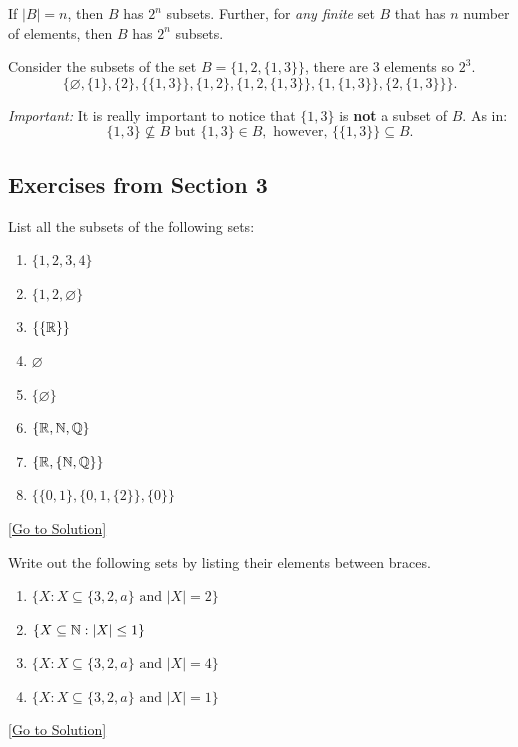 \begin{fact}
    If $\lvert B \rvert=n$, then $B$ has $2^n$ subsets. Further, for \emph{any finite} set $B$ that has $n$ number of elements, then $B$ has $2^n$ subsets.    
\end{fact}

\begin{example}
    Consider the subsets of the set $B=\{ 1,2,\{ 1,3 \} \}$, there are $3$ elements so $2^3$. 
    $$
    \{\varnothing,\{ 1 \},\{ 2 \}, \{ \{ 1,3 \} \}, \{ 1,2 \},\{ 1,2,\{ 1,3 \} \}, \{ 1,\{ 1,3 \} \},\{ 2,\{ 1,3 \} \}\}.
    $$
    
    \emph{Important:} It is really important to notice that $\{ 1,3 \}$ is \textbf{not} a subset of $B$. As in: 
    $$
    \{ 1,3 \}\not\subseteq B \text{ but }\{ 1,3 \}\in B, \text{ however, } \{ \{ 1,3 \} \}\subseteq B.
    $$
\end{example}

\subsection{Exercises from Section 3}
\begin{exercise}\label{ex:3.1}
    List all the subsets of the following sets:
    \begin{enumerate}
        \item $\{ 1,2,3,4 \}$
        \item $\{ 1,2,\varnothing \}$
        \item $\{ \{ \mathbb{R} \} \}$
        \item $\varnothing$
        \item $\{ \varnothing \}$
        \item $\{ \mathbb{R},\mathbb{N},\mathbb{Q} \}$
        \item $\{ \mathbb{R},\{ \mathbb{N},\mathbb{Q} \} \}$
        \item $\{ \{ 0,1 \},\{ 0,1,\{ 2 \} \},\{ 0 \} \}$
    \end{enumerate}
\end{exercise}\hyperref[sol:3.1]{[Go to Solution]}


\begin{exercise}\label{ex:3.2}
    Write out the following sets by listing their elements between braces.
    \begin{enumerate}
        \item $\{ X:X\subseteq \{ 3,2,a \}\text{ and } \lvert X \rvert=2 \}$
        \item $\{ X\subseteq\mathbb{N}:\lvert X \rvert\le 1 \}$
        \item $\{ X:X\subseteq \{ 3,2,a \}\text{ and }\lvert X \rvert=4 \}$
        \item $\{ X:X\subseteq \{ 3,2,a \}\text{ and }\lvert X \rvert=1 \}$
    \end{enumerate}
\end{exercise}\hyperref[sol:3.2]{[Go to Solution]}


